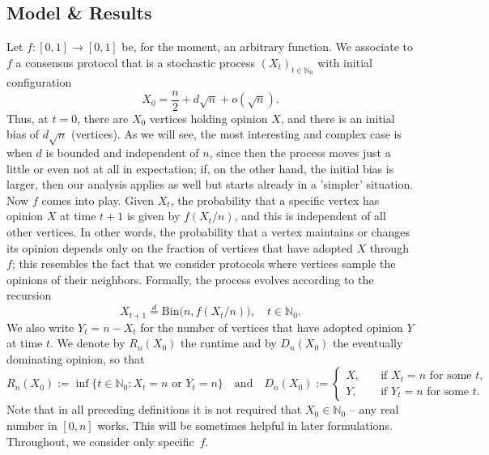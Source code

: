 \documentclass[11pt]{article}
\newcommand{\Bin}{\mathrm{Bin}}
\numberwithin{theorem}{section}
\begin{document}
\subsection{Model \& Results}
\label{ssec:model}

Let $f:[0,1] \rightarrow [0,1]$ be, for the moment, an arbitrary function. We associate to $f$ a consensus protocol that is a stochastic process $(X_t)_{t\in\mathbb{N}_0}$ with initial configuration
\begin{equation*}
    X_0 = \frac{n}{2} + d \sqrt{n} +o(\sqrt{n}).    
\end{equation*}
Thus, at $t=0$, there are $X_0$ vertices holding opinion $X$, and there is an initial bias of  $d\sqrt{n}$ (vertices). As we will see, the most interesting and complex case is when $d$ is bounded and independent of $n$, since then the process moves just a little or even not at all in expectation; if, on the other hand, the initial bias is larger, then our analysis applies as well but starts already in a 'simpler' situation. Now $f$ comes into play. Given $X_t$, the probability that a specific vertex has opinion $X$ at time $t+1$ is given by $f(X_t/n)$, and this is independent of all other vertices. In other words, the probability that a vertex maintains or changes its opinion depends only on the fraction of vertices that have adopted $X$ through $f$; this resembles the fact that we consider protocols where vertices sample the opinions of their neighbors. Formally, the process evolves according to the recursion
\begin{equation*}
    X_{t+1} \stackrel{d}{=} \Bin\big(n,f(X_t/n)\big), \quad t \in \mathbb{N}_0.
\end{equation*}
We also write $Y_t = n - X_t$ for the number of vertices that have adopted opinion $Y$ at time $t$. We denote by $R_n(X_0)$ the runtime and by $D_n(X_0)$ the eventually dominating opinion, so that
\begin{equation*}
    R_n(X_0) := \inf\big\{t\in \mathbb{N}_0 : X_t =n \text{ or } Y_t =n\big\}
    \quad\text{and}\quad
    D_n(X_0):=\begin{cases}
        X,\quad &\text{if } X_t=n \text{ for some } t,\\
        Y,\quad &\text{if } Y_t=n \text{ for some } t.
    \end{cases}
\end{equation*}
Note that in all preceding definitions it is not required that $X_0 \in \mathbb{N}_0$ -- any real number in $[0,n]$ works. This will be sometimes helpful in later formulations. Throughout, we consider only specific~$f$.
\end{document}
